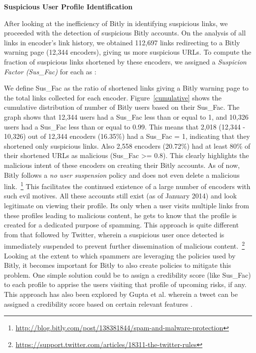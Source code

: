 \documentclass[conference]{IEEEtran}
\begin{document}
\vspace{4pt}
\textbf{Suspicious User Profile Identification}


After looking at the inefficiency of Bitly in identifying suspicious links, we proceeded with the detection of suspicious Bitly accounts. On the analysis of all links in encoder's link history, we obtained 112,697 links redirecting to a Bitly warning page (12,344 encoders), giving us more suspicious URLs. To compute the fraction of suspicious links shortened by these encoders, we assigned a \textit{Suspicion Factor (Sus\_Fac)} for each as :
  
We define Sus\_Fac as the ratio of shortened links giving a Bitly warning page to the total links collected for each encoder. Figure~\ref{cumulative} shows the cumulative distribution of number of Bitly users based on their Sus\_Fac. The graph shows that 12,344 users had a Sus\_Fac less than or equal to 1, and 10,326 users had a Sus\_Fac less than or equal to 0.99. This means that 2,018 (12,344 - 10,326) out of 12,344 encoders (16.35\%) had a Sus\_Fac = 1, indicating that they shortened only suspicious links. Also 2,558 encoders (20.72\%) had at least 80\% of their shortened URLs as malicious (Sus\_Fac \textgreater= 0.8). This clearly highlights the malicious intent of these encoders on creating their Bitly accounts. As of now, Bitly follows a \textit{no user suspension} policy and does not even delete a malicious link.~\footnote{\url{http://blog.bitly.com/post/138381844/spam-and-malware-protection}} This facilitates the continued existence of a large number of encoders with such evil motives. All these accounts still exist (as of January 2014) and look legitimate on viewing their profile. Its only when a user visits multiple links from these profiles leading to malicious content, he gets to know that the profile is created for a dedicated purpose of spamming. This approach is quite different from that followed by Twitter, wherein a suspicious user once detected is immediately suspended to prevent further dissemination of malicious content.~\footnote{\url{https://support.twitter.com/articles/18311-the-twitter-rules}} Looking at the extent to which spammers are leveraging the policies used by Bitly, it becomes important for Bitly to also create policies to mitigate this problem. One simple solution could be to assign a credibility score (like Sus\_Fac) to each profile to apprise the users visiting that profile of upcoming risks, if any. This approach has also been explored by Gupta et al. wherein a tweet can be assigned a credibility score based on certain relevant features \cite{22}.  
\end{document}
